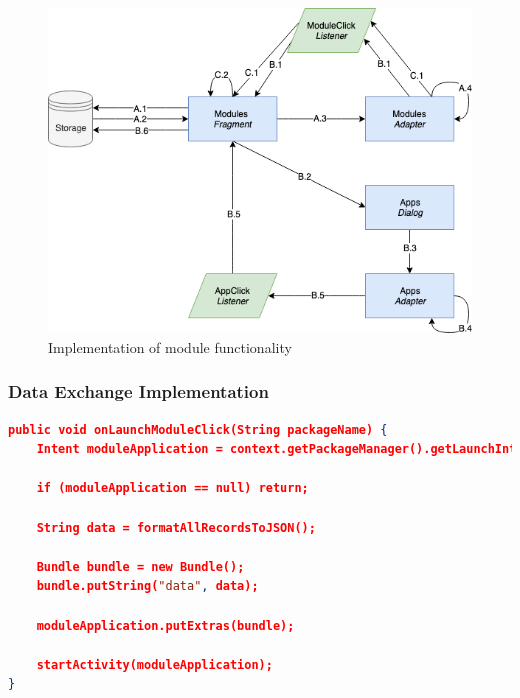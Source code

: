 \begin{figure}
    \centering
    \includegraphics[scale=0.6]{images/Module_Imp.png}
    \caption{Implementation of module functionality}
    \label{fig:impl_modules}
\end{figure}

\subsubsection{Data Exchange Implementation}
\begin{lstlisting}[language=json, caption={My Caption}, captionpos=b]
public void onLaunchModuleClick(String packageName) {
    Intent moduleApplication = context.getPackageManager().getLaunchIntentForPackage(packageName);
    
    if (moduleApplication == null) return;

    String data = formatAllRecordsToJSON();

    Bundle bundle = new Bundle();
    bundle.putString("data", data);

    moduleApplication.putExtras(bundle);

    startActivity(moduleApplication);
}

\end{lstlisting}




